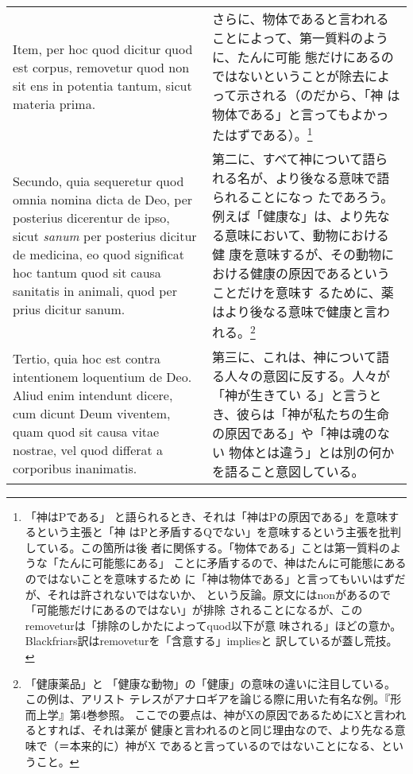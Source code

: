 \documentclass[10pt]{jsarticle}
\begin{document}
\begin{longtable}{p{21em}p{21em}}
Item, per hoc quod dicitur quod est corpus, removetur quod non sit ens
in potentia tantum, sicut materia prima.

&

さらに、物体であると言われることによって、第一質料のように、たんに可能
態だけにあるのではないということが除去によって示される（のだから、「神
は物体である」と言ってもよかったはずである）。\footnote{「神はPである」
と語られるとき、それは「神はPの原因である」を意味するという主張と「神
はPと矛盾するQでない」を意味するという主張を批判している。この箇所は後
者に関係する。「物体である」ことは第一質料のような「たんに可能態にある」
ことに矛盾するので、神はたんに可能態にあるのではないことを意味するため
に「神は物体である」と言ってもいいはずだが、それは許されないではないか、
という反論。原文にはnonがあるので「可能態だけにあるのではない」が排除
されることになるが、このremoveturは「排除のしかたによってquod以下が意
味される」ほどの意か。Blackfriars訳はremoveturを「含意する」impliesと
訳しているが蓋し荒技。}

\\

Secundo, quia sequeretur quod omnia nomina dicta de Deo, per posterius
dicerentur de ipso, sicut {\it sanum} per posterius dicitur de
medicina, eo quod significat hoc tantum quod sit causa sanitatis in
animali, quod per prius dicitur sanum.

&

第二に、すべて神について語られる名が、より後なる意味で語られることになっ
たであろう。例えば「健康な」は、より先なる意味において、動物における健
康を意味するが、その動物における健康の原因であるということだけを意味す
るために、薬はより後なる意味で健康と言われる。\footnote{「健康薬品」と
「健康な動物」の「健康」の意味の違いに注目している。この例は、アリスト
テレスがアナロギアを論じる際に用いた有名な例。『形而上学』第4巻参照。
ここでの要点は、神がXの原因であるためにXと言われるとすれば、それは薬が
健康と言われるのと同じ理由なので、より先なる意味で（＝本来的に）神がX
であると言っているのではないことになる、ということ。}

\\

Tertio, quia hoc est contra intentionem loquentium de Deo. Aliud enim
intendunt dicere, cum dicunt Deum viventem, quam quod sit causa vitae
nostrae, vel quod differat a corporibus inanimatis.

&

第三に、これは、神について語る人々の意図に反する。人々が「神が生きてい
る」と言うとき、彼らは「神が私たちの生命の原因である」や「神は魂のない
物体とは違う」とは別の何かを語ること意図している。


\end{longtable}
\end{document}
